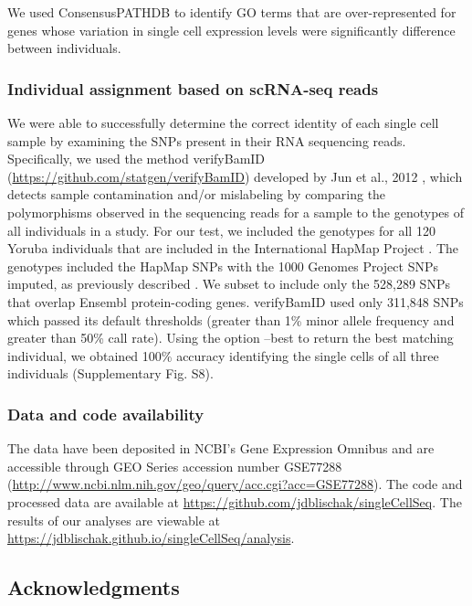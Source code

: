 We used ConsensusPATHDB \citep{Kamburov2011} to identify GO terms that
are over-represented for genes whose variation in single cell expression
levels were significantly difference between individuals.

\subsubsection{Individual assignment based on scRNA-seq
reads}\label{individual-assignment-based-on-scrna-seq-reads}

We were able to successfully determine the correct identity of each
single cell sample by examining the SNPs present in their RNA sequencing
reads. Specifically, we used the method verifyBamID
(\url{https://github.com/statgen/verifyBamID}) developed by Jun et al.,
2012 \citep{Jun2012}, which detects sample contamination and/or
mislabeling by comparing the polymorphisms observed in the sequencing
reads for a sample to the genotypes of all individuals in a study. For
our test, we included the genotypes for all 120 Yoruba individuals that
are included in the International HapMap Project
\citep{HapMapConsortium2005}. The genotypes included the HapMap SNPs with
the 1000 Genomes Project SNPs \citep{OneKGConsortium2012} imputed, as
previously described \citep{McVicker2013}. We subset to include only the
528,289 SNPs that overlap Ensembl protein-coding genes. verifyBamID used
only 311,848 SNPs which passed its default thresholds (greater than 1\%
minor allele frequency and greater than 50\% call rate). Using the
option --best to return the best matching individual, we obtained 100\%
accuracy identifying the single cells of all three individuals
(Supplementary Fig. S8).

\subsubsection{Data and code
availability}\label{data-and-code-availability}

The data have been deposited in NCBI's Gene Expression Omnibus
\citep{Edgar2002} and are accessible through GEO Series accession number
GSE77288
(\url{http://www.ncbi.nlm.nih.gov/geo/query/acc.cgi?acc=GSE77288}). The
code and processed data are available at
\url{https://github.com/jdblischak/singleCellSeq}. The results of our
analyses are viewable at
\url{https://jdblischak.github.io/singleCellSeq/analysis}.

\subsection{Acknowledgments}\label{acknowledgments}

